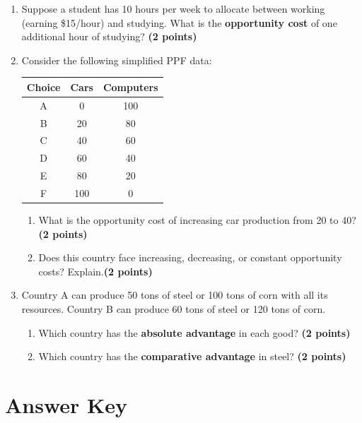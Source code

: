 \documentclass[12pt]{article}
\begin{document}
\begin{enumerate}[resume]
    \item Suppose a student has 10 hours per week to allocate between working (earning \$15/hour) and studying. What is the \textbf{opportunity cost} of one additional hour of studying? \textbf{(2 points)}

    \item Consider the following simplified PPF data:

    \begin{center}
    \begin{tabular}{ccc}
    \toprule
    Choice & Cars & Computers \\
    \midrule
    A & 0 & 100 \\
    B & 20 & 80 \\
    C & 40 & 60 \\
    D & 60 & 40 \\
    E & 80 & 20 \\
    F & 100 & 0 \\
    \bottomrule
    \end{tabular}
    \end{center}

    \begin{enumerate}
        \item What is the opportunity cost of increasing car production from 20 to 40?  \textbf{(2 points)}
        \item Does this country face increasing, decreasing, or constant opportunity costs? Explain.\textbf{(2 points)}
    \end{enumerate}

    \item Country A can produce 50 tons of steel or 100 tons of corn with all its resources. Country B can produce 60 tons of steel or 120 tons of corn.
    \begin{enumerate}
        \item Which country has the \textbf{absolute advantage} in each good?  \textbf{(2 points)}
        \item Which country has the \textbf{comparative advantage} in steel?  \textbf{(2 points)}
    \end{enumerate}
\end{enumerate}

\newpage
\section*{Answer Key}
\end{document}
